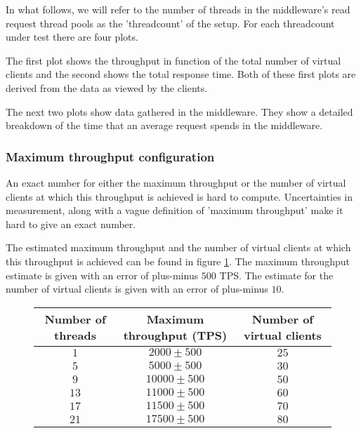 \documentclass[11pt]{article}
\begin{document}
In what follows, we will refer to the number of threads in the middleware's read request thread pools as the 'threadcount' of the setup.
For each threadcount under test there are four plots.

The first plot shows the throughput in function of the total number of virtual clients and the second shows the total response time.
Both of these first plots are derived from the data as viewed by the clients.

The next two plots show data gathered in the middleware.
They show a detailed breakdown of the time that an average request spends in the middleware.

\subsubsection{Maximum throughput configuration}


An exact number for either the maximum throughput or the number of virtual clients at which this throughput is achieved is hard to compute.
Uncertainties in measurement, along with a vague definition of 'maximum throughput' make it hard to give an exact number.

The estimated maximum throughput and the number of virtual clients at which this throughput is achieved can be found in figure \ref{fig:maximum-throughput-numbers}.
The maximum throughput estimate is given with an error of plus-minus $500$ TPS.
The estimate for the number of virtual clients is given with an error of plus-minus $10$.

\begin{figure}[H]
  \centering
  \begin{tabular}{c|c|c}
    Number of threads & Maximum throughput (TPS) & Number of virtual clients \\
    \hline $1$ & $2000 \pm 500$ & $25$ \\
    \hline $5$ & $5000 \pm 500$ & $30$ \\
    \hline $9$ & $10000 \pm 500$ & $50$ \\
    \hline $13$ & $11000 \pm 500$ & $60$ \\
    \hline $17$ & $11500 \pm 500$ & $70$ \\
    \hline $21$ & $17500 \pm 500$ & $80$ \\
  \end{tabular}
  \label{fig:maximum-throughput-numbers}
\end{figure}
\end{document}
